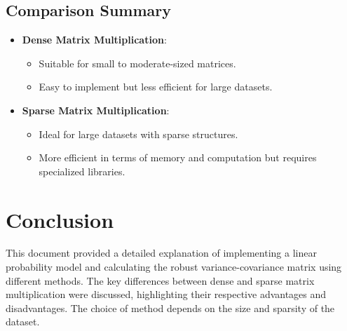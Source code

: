 \documentclass{article}
\begin{document}
\subsection{Comparison Summary}
\begin{itemize}
    \item \textbf{Dense Matrix Multiplication}:
        \begin{itemize}
            \item Suitable for small to moderate-sized matrices.
            \item Easy to implement but less efficient for large datasets.
        \end{itemize}
    \item \textbf{Sparse Matrix Multiplication}:
        \begin{itemize}
            \item Ideal for large datasets with sparse structures.
            \item More efficient in terms of memory and computation but requires specialized libraries.
        \end{itemize}
\end{itemize}

\section{Conclusion}
This document provided a detailed explanation of implementing a linear probability model and calculating the robust variance-covariance matrix using different methods. The key differences between dense and sparse matrix multiplication were discussed, highlighting their respective advantages and disadvantages. The choice of method depends on the size and sparsity of the dataset.
\end{document}

